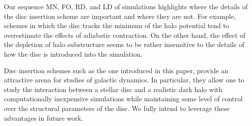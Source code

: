 Our sequence MN, FO, RD, and LD of simulations highlights where the
details of the disc insertion scheme are important and where they are
not.  For example, schemes in which the disc tracks the minimum of the
halo potential tend to overestimate the effects of adiabatic
contraction.  On the other hand, the effect of the depletion of halo
substructure seems to be rather insensitive to the details of how the
disc is introduced into the simulation.


Disc insertion schemes such as the one introduced in this paper,
provide an attractive arena for
studies of galactic dynamics. In particular, they allow one to study the interaction between a stellar disc and a realistic dark halo with computationally inexpensive simulations while maintaining some level of control over the structural parameters of the disc.  We fully intend to leverage these advantages in future work.





